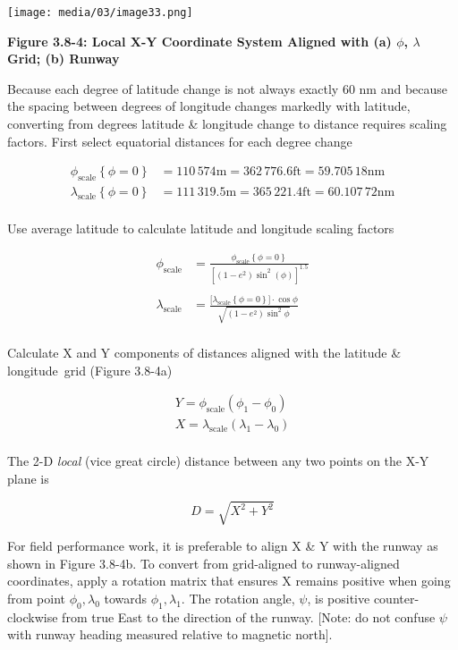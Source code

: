 \documentclass[
]{book}
\begin{document}
\texttt{[image: media/03/image33.png]}

\textbf{Figure 3.8-4: Local X-Y Coordinate System Aligned with (a) \(\phi\), \(\lambda\) Grid; (b) Runway}

Because each degree of latitude change is not always exactly \(60\) nm and because the spacing between degrees of longitude changes markedly with latitude, converting from degrees latitude \& longitude change to distance requires scaling factors.
First select equatorial distances for each degree change

\begin{align}
\phi_{\mathrm{scale}} \left\{ \phi = 0 \right\} &= 110\,574 \text{m} = 362\,776.6 \text{ft} = 59.705\,18 \text{nm} \\
\lambda_{\mathrm{scale}} \left\{ \phi = 0 \right\} &= 111\,319.5 \text{m} = 365\,221.4 \text{ft} = 60.107\,72 \text{nm} \\
\end{align}

Use average latitude to calculate latitude and longitude scaling factors

\begin{align}
\phi_{\mathrm{scale}} &= \frac{\phi_{\mathrm{scale}} \left\{ \phi = 0 \right\} }{ \left\lbrack \left( 1 - e^{2} \right)  \sin^{2}(\phi) \right\rbrack^{1.5} } \\
\\
\lambda_{\mathrm{scale}} &= \frac{\lbrack \lambda_{\mathrm{scale}} \left\{ \phi = 0 \right\} \rbrack \cdot \cos{\phi}}{\sqrt{ \left(1 - e^2 \right) \sin^{2}{\phi}}} \\
\end{align}

Calculate X and Y components of distances aligned with the latitude \& longitude~grid (Figure 3.8-4a)

\begin{align}
Y = \phi_{\mathrm{scale}} \left(\phi_1 - \phi_0 \right) \\
X = \lambda_{\mathrm{scale}} \left(\lambda_1 - \lambda_0 \right) \\
\end{align}

The 2-D \emph{local} (vice great circle) distance between any two points on the X-Y plane is

\[D = \sqrt{X^2 + Y^2} \]

For field performance work, it is preferable to align X \& Y with the runway as shown in Figure 3.8-4b. To convert from grid-aligned to runway-aligned coordinates, apply a rotation matrix that ensures X remains positive when going from point \(\phi_0, \lambda_0\) towards \(\phi_1, \lambda_1\). The rotation angle, \(\psi\), is positive counter-clockwise from true East to the direction of the runway. {[}Note: do not confuse \(\psi\) with runway heading measured relative to magnetic north{]}.
\end{document}
